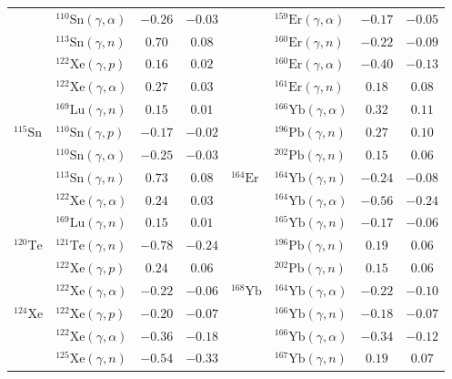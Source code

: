 \begin{table}
\begin{tabular}{llcc|llcc}
    $ $ & $^{110}\mathrm{Sn}(\gamma,\alpha)$ & $-0.26$ & $-0.03$ & $ $ & $^{159}\mathrm{Er}(\gamma,\alpha)$ & $-0.17$ & $-0.05$ \\ 
    $ $ & $^{113}\mathrm{Sn}(\gamma,n)$ & $0.70$ & $0.08$ & $ $ & $^{160}\mathrm{Er}(\gamma,n)$ & $-0.22$ & $-0.09$ \\ 
    $ $ & $^{122}\mathrm{Xe}(\gamma,p)$ & $0.16$ & $0.02$ & $ $ & $^{160}\mathrm{Er}(\gamma,\alpha)$ & $-0.40$ & $-0.13$ \\ 
    $ $ & $^{122}\mathrm{Xe}(\gamma,\alpha)$ & $0.27$ & $0.03$ & $ $ & $^{161}\mathrm{Er}(\gamma,n)$ & $0.18$ & $0.08$ \\ 
    $ $ & $^{169}\mathrm{Lu}(\gamma,n)$ & $0.15$ & $0.01$ & $ $ & $^{166}\mathrm{Yb}(\gamma,\alpha)$ & $0.32$ & $0.11$ \\ 
    $^{115}\mathrm{Sn}$ & $^{110}\mathrm{Sn}(\gamma,p)$ & $-0.17$ & $-0.02$ & $ $ & $^{196}\mathrm{Pb}(\gamma,n)$ & $0.27$ & $0.10$ \\ 
    $ $ & $^{110}\mathrm{Sn}(\gamma,\alpha)$ & $-0.25$ & $-0.03$ & $ $ & $^{202}\mathrm{Pb}(\gamma,n)$ & $0.15$ & $0.06$ \\ 
    $ $ & $^{113}\mathrm{Sn}(\gamma,n)$ & $0.73$ & $0.08$ & $^{164}\mathrm{Er}$ & $^{164}\mathrm{Yb}(\gamma,n)$ & $-0.24$ & $-0.08$ \\ 
    $ $ & $^{122}\mathrm{Xe}(\gamma,\alpha)$ & $0.24$ & $0.03$ & $ $ & $^{164}\mathrm{Yb}(\gamma,\alpha)$ & $-0.56$ & $-0.24$ \\ 
    $ $ & $^{169}\mathrm{Lu}(\gamma,n)$ & $0.15$ & $0.01$ & $ $ & $^{165}\mathrm{Yb}(\gamma,n)$ & $-0.17$ & $-0.06$ \\ 
    $^{120}\mathrm{Te}$ & $^{121}\mathrm{Te}(\gamma,n)$ & $-0.78$ & $-0.24$ & $ $ & $^{196}\mathrm{Pb}(\gamma,n)$ & $0.19$ & $0.06$ \\ 
    $ $ & $^{122}\mathrm{Xe}(\gamma,p)$ & $0.24$ & $0.06$ & $ $ & $^{202}\mathrm{Pb}(\gamma,n)$ & $0.15$ & $0.06$ \\ 
    $ $ & $^{122}\mathrm{Xe}(\gamma,\alpha)$ & $-0.22$ & $-0.06$ & $^{168}\mathrm{Yb}$ & $^{164}\mathrm{Yb}(\gamma,\alpha)$ & $-0.22$ & $-0.10$ \\ 
    $^{124}\mathrm{Xe}$ & $^{122}\mathrm{Xe}(\gamma,p)$ & $-0.20$ & $-0.07$ & $ $ & $^{166}\mathrm{Yb}(\gamma,n)$ & $-0.18$ & $-0.07$ \\ 
    $ $ & $^{122}\mathrm{Xe}(\gamma,\alpha)$ & $-0.36$ & $-0.18$ & $ $ & $^{166}\mathrm{Yb}(\gamma,\alpha)$ & $-0.34$ & $-0.12$ \\ 
    $ $ & $^{125}\mathrm{Xe}(\gamma,n)$ & $-0.54$ & $-0.33$ & $ $ & $^{167}\mathrm{Yb}(\gamma,n)$ & $0.19$ & $0.07$ \\ 

\end{tabular}
\end{table}
